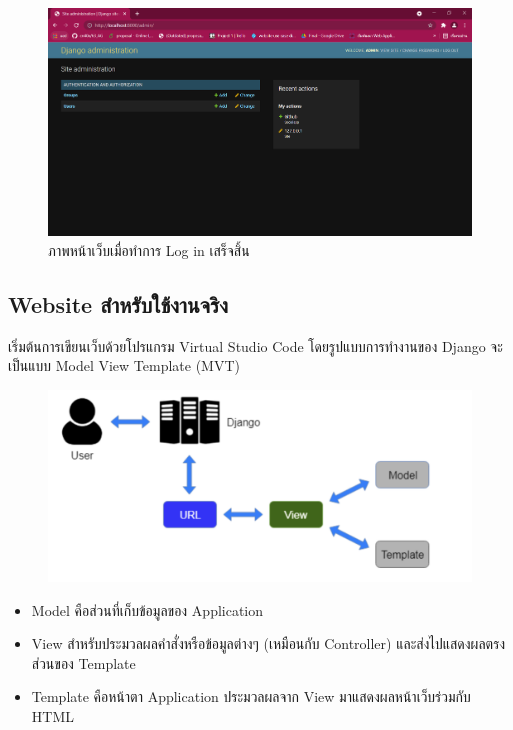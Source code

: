 \begin{figure}[!thb]
	\captionsetup{justification=centering}
	\centering
	\includegraphics[width=5in]{figures/adminlogin.png}
	\caption{ภาพหน้าเว็บเมื่อทำการ Log in เสร็จสิ้น}
	\label{figure:adminlogin}
\end{figure}
\newpage

\subsection{Website สำหรับใช้งานจริง}
เริ่มต้นการเขียนเว็บด้วยโปรแกรม Virtual Studio Code
โดยรูปแบบการทำงานของ Django จะเป็นแบบ Model View Template (MVT)
\begin{figure}[!thb]
	\captionsetup{justification=centering}
	\centering
	\includegraphics[width=5in]{figures/mvt.png}
	\label{figure:mvt}
\end{figure}

\begin{itemize}
    \item Model คือส่วนที่เก็บข้อมูลของ Application
    \item View สำหรับประมวลผลคำสั่งหรือข้อมูลต่างๆ (เหมือนกับ Controller) และส่งไปแสดงผลตรงส่วนของ Template
    \item Template คือหน้าตา Application ประมวลผลจาก View มาแสดงผลหน้าเว็บร่วมกับ HTML
\end{itemize}

